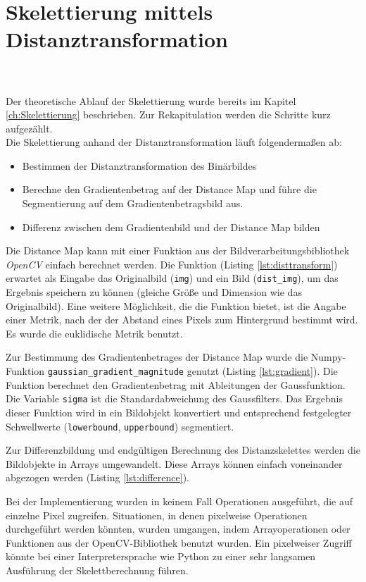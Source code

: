 \section{Skelettierung mittels Distanztransformation}
\label{sec:impl_distanztrans}
\\\\
Der theoretische Ablauf der Skelettierung wurde bereits im Kapitel \ref{ch:Skelettierung} beschrieben. Zur
Rekapitulation werden die Schritte kurz aufgezählt. \\
Die Skelettierung anhand der Distanztransformation läuft folgendermaßen ab:
\begin{itemize}
\item Bestimmen der Distanztransformation des Binärbildes
\item Berechne den Gradientenbetrag auf der Distance Map und führe die Segmentierung auf dem Gradientenbetragsbild aus.
\item Differenz zwischen dem Gradientenbild und der Distance Map bilden
\end{itemize}
Die Distance Map kann mit einer Funktion aus der Bildverarbeitungsbibliothek \emph{OpenCV} einfach berechnet
werden. Die Funktion (Listing \ref{lst:disttransform}) erwartet als Eingabe das Originalbild (\texttt{img}) und ein Bild (\texttt{dist\_img}), um
das Ergebnis speichern zu können (gleiche Größe und Dimension wie das Originalbild). Eine weitere Möglichkeit, die die Funktion bietet, ist die Angabe einer Metrik, nach der der Abstand eines Pixels zum
Hintergrund bestimmt wird. Es wurde die euklidische Metrik benutzt.

Zur Bestimmung des Gradientenbetrages der Distance Map wurde die Numpy-Funktion \texttt{gaussian\_gradient\_magnitude} genutzt (Listing \ref{lst:gradient}). Die Funktion berechnet den Gradientenbetrag mit Ableitungen
der Gaussfunktion. Die Variable \texttt{sigma} ist die Standardabweichung 
des Gaussfilters. Das Ergebnis dieser Funktion wird in ein Bildobjekt
konvertiert und entsprechend festgelegter Schwellwerte (\texttt{lowerbound}, \texttt{upperbound}) segmentiert.

Zur Differenzbildung und endgültigen Berechnung des Distanzskelettes werden die Bildobjekte in Arrays umgewandelt. Diese Arrays können einfach voneinander abgezogen werden (Listing \ref{lst:difference}). 

Bei der Implementierung wurden in keinem Fall Operationen ausgeführt, die auf einzelne Pixel zugreifen. Situationen, in denen
pixelweise Operationen durchgeführt werden könnten, wurden
umgangen, indem Arrayoperationen oder Funktionen aus der
OpenCV-Bibliothek benutzt wurden. Ein pixelweiser Zugriff
könnte bei einer Interpretersprache wie Python zu einer sehr langsamen
Ausführung der Skelettberechnung führen.